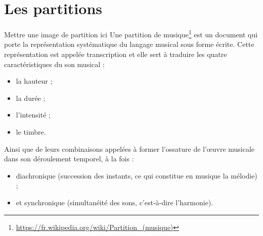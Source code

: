 \section{Les partitions}
Mettre une image de partition ici
Une partition de musique\footnote{\url{https://fr.wikipedia.org/wiki/Partition\_(musique)}} est un document qui porte la représentation systématique du langage musical sous forme écrite. Cette représentation est appelée transcription et elle sert à traduire les quatre caractéristiques du son musical :
\begin{itemize}
	\item la hauteur ;
	\item la durée ;
	\item l'intensité ;
	\item le timbre.
\end{itemize}
Ainsi que de leurs combinaisons appelées à former l'ossature de l'œuvre musicale dans son déroulement temporel, à la fois :
\begin{itemize}
	\item diachronique (succession des instants, ce qui constitue en musique la mélodie) ;
	\item et synchronique (simultanéité des sons, c'est-à-dire l'harmonie).
\end{itemize}
